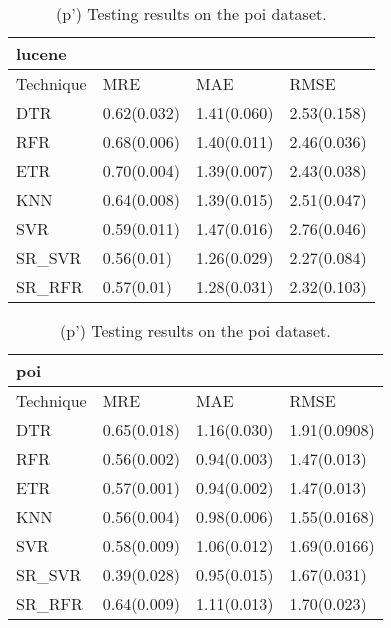 \documentclass[]{article}
\begin{document}
\begin{table}[h]
	\captionsetup[subtable]{labelformat=empty}
	\begin{adjustwidth}{-3.4cm}{}
		\begin{subtable}{9.5cm}
			\centering
			\caption{(o') Testing results on the lucene dataset.}
			\label{tab:xalan-wv}
			\begin{tabular}{llll}
				\hline
				lucene &             &             &             \\ \hline
				Technique  & MRE         & MAE         & RMSE        \\ \hline
				DTR        & 0.62(0.032) & 1.41(0.060) & 2.53(0.158) \\
				RFR        & 0.68(0.006) & 1.40(0.011) & 2.46(0.036) \\
				ETR        & 0.70(0.004) & 1.39(0.007) & 2.43(0.038) \\
				KNN        & 0.64(0.008) & 1.39(0.015) & 2.51(0.047) \\
				SVR        & 0.59(0.011) & 1.47(0.016) & 2.76(0.046) \\
				SR\_SVR     & 0.56(0.01)  & 1.26(0.029) & 2.27(0.084) \\
				SR\_RFR     & 0.57(0.01)  & 1.28(0.031) & 2.32(0.103) \\ \hline
			\end{tabular}
		\end{subtable}
		\begin{subtable}{9.5cm}
			\centering
			\caption{(p') Testing results on the poi dataset.}
			\label{tab:xerces-wv}
			\begin{tabular}{llll}
				\hline
				poi   &              &             &              \\ \hline
				Technique & MRE          & MAE         & RMSE         \\ \hline
				DTR       & 0.65(0.018)  & 1.16(0.030) & 1.91(0.0908) \\
				RFR       & 0.56(0.002)  & 0.94(0.003) & 1.47(0.013)  \\
				ETR       & 0.57(0.001)  & 0.94(0.002) & 1.47(0.013)  \\
				KNN       & 0.56(0.004)  & 0.98(0.006) & 1.55(0.0168) \\
				SVR       & 0.58(0.009)  & 1.06(0.012) & 1.69(0.0166) \\
				SR\_SVR    & 0.39(0.028)  & 0.95(0.015) & 1.67(0.031)  \\
				SR\_RFR    & 0.64(0.009)  & 1.11(0.013) & 1.70(0.023)  \\ \hline
			\end{tabular}
		\end{subtable} 
	\end{adjustwidth}
\end{table}
\end{document}
